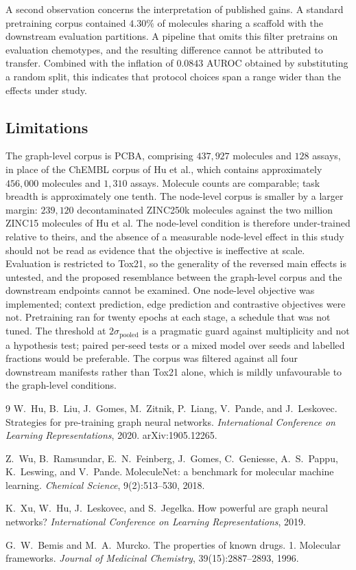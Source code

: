 \documentclass[11pt,a4paper]{article}
\begin{document}
A second observation concerns the interpretation of published gains. A standard
pretraining corpus contained $4.30\%$ of molecules sharing a scaffold with the
downstream evaluation partitions. A pipeline that omits this filter pretrains on
evaluation chemotypes, and the resulting difference cannot be attributed to
transfer. Combined with the inflation of $0.0843$ AUROC obtained by substituting
a random split, this indicates that protocol choices span a range wider than the
effects under study.

\subsection*{Limitations}

The graph-level corpus is PCBA, comprising $437{,}927$ molecules and $128$ assays,
in place of the ChEMBL corpus of Hu et al., which contains approximately
$456{,}000$ molecules and $1{,}310$ assays. Molecule counts are comparable; task
breadth is approximately one tenth. The node-level corpus is smaller by a larger
margin: $239{,}120$ decontaminated ZINC250k molecules against the two million
ZINC15 molecules of Hu et al. The node-level condition is therefore
under-trained relative to theirs, and the absence of a measurable node-level
effect in this study should not be read as evidence that the objective is
ineffective at scale. Evaluation is restricted to Tox21, so the
generality of the reversed main effects is untested, and the proposed
resemblance between the graph-level corpus and the downstream endpoints cannot
be examined. One node-level objective was implemented;
context prediction, edge prediction and contrastive objectives were not.
Pretraining ran for twenty epochs at each stage, a schedule that was not tuned.
The threshold at $2\sigma_{\mathrm{pooled}}$ is a pragmatic guard against
multiplicity and not a hypothesis test; paired per-seed tests or a mixed model
over seeds and labelled fractions would be preferable. The corpus was filtered against all
four downstream manifests rather than Tox21 alone, which is mildly unfavourable
to the graph-level conditions.

\begin{thebibliography}{9}
\small
{}
W.~Hu, B.~Liu, J.~Gomes, M.~Zitnik, P.~Liang, V.~Pande, and J.~Leskovec.
Strategies for pre-training graph neural networks.
\textit{International Conference on Learning Representations}, 2020.
arXiv:1905.12265.

Z.~Wu, B.~Ramsundar, E.~N.~Feinberg, J.~Gomes, C.~Geniesse, A.~S.~Pappu,
K.~Leswing, and V.~Pande.
MoleculeNet: a benchmark for molecular machine learning.
\textit{Chemical Science}, 9(2):513--530, 2018.

K.~Xu, W.~Hu, J.~Leskovec, and S.~Jegelka.
How powerful are graph neural networks?
\textit{International Conference on Learning Representations}, 2019.

G.~W.~Bemis and M.~A.~Murcko.
The properties of known drugs. 1. Molecular frameworks.
\textit{Journal of Medicinal Chemistry}, 39(15):2887--2893, 1996.
\end{thebibliography}
\end{document}

